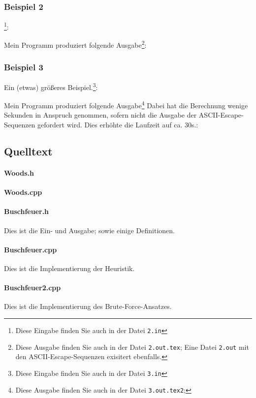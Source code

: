 \subsubsection{Beispiel 2}
\footnote{Diese Eingabe finden Sie auch in der Datei \texttt{2.in}}:
{\small

}
Mein Programm produziert folgende Ausgabe\footnote{Diese Ausgabe finden Sie auch in der Datei \texttt{2.out.tex}; Eine Datei \texttt{2.out} mit den ASCII-Escape-Sequenzen exisitert ebenfalls.}:\\
{\ttfamily \small

}
\subsubsection{Beispiel 3}
Ein (etwas) größeres Beispiel.\footnote{Diese Eingabe finden Sie auch in der Datei \texttt{3.in}}:
{\small

}
Mein Programm produziert folgende Ausgabe\footnote{Diese Ausgabe finden Sie auch in der Datei \texttt{3.out.tex2};} Dabei hat die Berechnung wenige Sekunden in Anspruch genommen, sofern nicht die Ausgabe der ASCII-Escape-Sequenzen gefordert wird. Dies erhöhte die Laufzeit auf ca. 30s.:\\
{\ttfamily \small

}

\subsection{Quelltext}
\paragraph{Woods.h} \mbox{}

{\small

}

\paragraph{Woods.cpp}\mbox{}

{\small

}

\paragraph{Buschfeuer.h} Dies ist die Ein- und Ausgabe; sowie einige Definitionen.

{\small

}

\paragraph{Buschfeuer.cpp} Dies ist die Implementierung der Heuristik.

{\small

}

\paragraph{Buschfeuer2.cpp} Dies ist die Implementierung des Brute-Force-Ansatzes.

{\small

}
